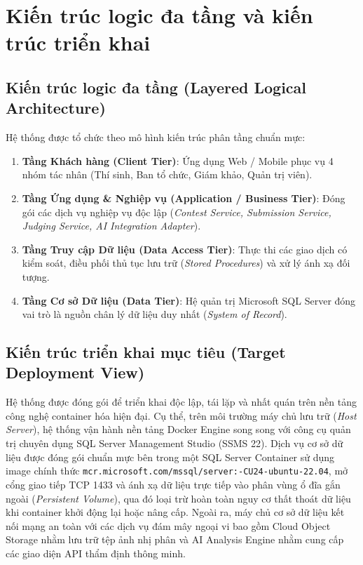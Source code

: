 \section{Kiến trúc logic đa tầng và kiến trúc triển khai}
\label{s:c3_logical_deployment}

\subsection{Kiến trúc logic đa tầng (Layered Logical Architecture)}
Hệ thống được tổ chức theo mô hình kiến trúc phân tầng chuẩn mực:
\begin{enumerate}
    \item \textbf{Tầng Khách hàng (Client Tier)}: Ứng dụng Web / Mobile phục vụ 4 nhóm tác nhân (Thí sinh, Ban tổ chức, Giám khảo, Quản trị viên).
    \item \textbf{Tầng Ứng dụng \& Nghiệp vụ (Application / Business Tier)}: Đóng gói các dịch vụ nghiệp vụ độc lập (\textit{Contest Service, Submission Service, Judging Service, AI Integration Adapter}).
    \item \textbf{Tầng Truy cập Dữ liệu (Data Access Tier)}: Thực thi các giao dịch có kiểm soát, điều phối thủ tục lưu trữ (\textit{Stored Procedures}) và xử lý ánh xạ đối tượng.
    \item \textbf{Tầng Cơ sở Dữ liệu (Data Tier)}: Hệ quản trị Microsoft SQL Server đóng vai trò là nguồn chân lý dữ liệu duy nhất (\textit{System of Record}).
\end{enumerate}

\subsection{Kiến trúc triển khai mục tiêu (Target Deployment View)}
Hệ thống được đóng gói để triển khai độc lập, tái lặp và nhất quán trên nền tảng công nghệ container hóa hiện đại. Cụ thể, trên môi trường máy chủ lưu trữ (\textit{Host Server}), hệ thống vận hành nền tảng Docker Engine song song với công cụ quản trị chuyên dụng SQL Server Management Studio (SSMS 22). Dịch vụ cơ sở dữ liệu được đóng gói chuẩn mực bên trong một SQL Server Container sử dụng image chính thức \texttt{mcr.microsoft.com/mssql/\allowbreak server:-CU24-ubuntu-22.04}, mở cổng giao tiếp TCP 1433 và ánh xạ dữ liệu trực tiếp vào phân vùng ổ đĩa gắn ngoài (\textit{Persistent Volume}), qua đó loại trừ hoàn toàn nguy cơ thất thoát dữ liệu khi container khởi động lại hoặc nâng cấp. Ngoài ra, máy chủ cơ sở dữ liệu kết nối mạng an toàn với các dịch vụ đám mây ngoại vi bao gồm Cloud Object Storage nhằm lưu trữ tệp ảnh nhị phân và AI Analysis Engine nhằm cung cấp các giao diện API thẩm định thông minh.

